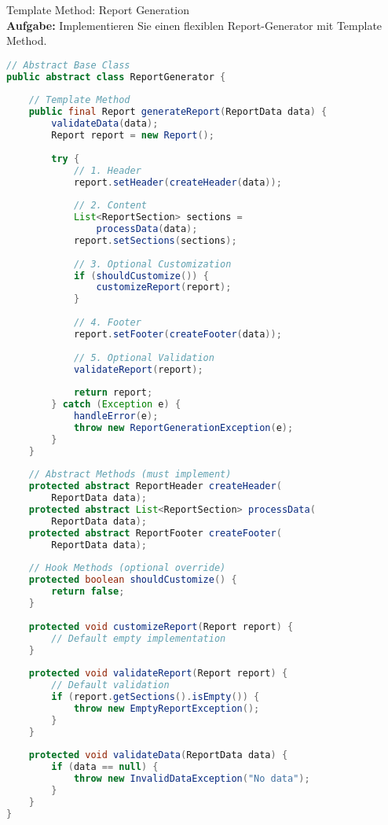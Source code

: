 \begin{example2}{Template Method: Report Generation}\\
\textbf{Aufgabe:} Implementieren Sie einen flexiblen Report-Generator mit Template Method.

\begin{lstlisting}[language=Java, style=basesmol]
// Abstract Base Class
public abstract class ReportGenerator {
    
    // Template Method
    public final Report generateReport(ReportData data) {
        validateData(data);
        Report report = new Report();
        
        try {
            // 1. Header
            report.setHeader(createHeader(data));
            
            // 2. Content
            List<ReportSection> sections = 
                processData(data);
            report.setSections(sections);
            
            // 3. Optional Customization
            if (shouldCustomize()) {
                customizeReport(report);
            }
            
            // 4. Footer
            report.setFooter(createFooter(data));
            
            // 5. Optional Validation
            validateReport(report);
            
            return report;
        } catch (Exception e) {
            handleError(e);
            throw new ReportGenerationException(e);
        }
    }
    
    // Abstract Methods (must implement)
    protected abstract ReportHeader createHeader(
        ReportData data);
    protected abstract List<ReportSection> processData(
        ReportData data);
    protected abstract ReportFooter createFooter(
        ReportData data);
    
    // Hook Methods (optional override)
    protected boolean shouldCustomize() {
        return false;
    }
    
    protected void customizeReport(Report report) {
        // Default empty implementation
    }
    
    protected void validateReport(Report report) {
        // Default validation
        if (report.getSections().isEmpty()) {
            throw new EmptyReportException();
        }
    }
    
    protected void validateData(ReportData data) {
        if (data == null) {
            throw new InvalidDataException("No data");
        }
    }
}


\end{lstlisting}
\end{example2}
